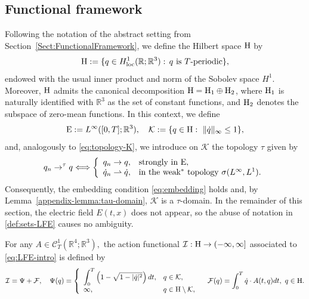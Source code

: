 \documentclass{article}
\newcommand{\boK}{\mathcal{K}}
\newcommand{\boI}{\mathcal{I}}
\newcommand{\R}{\mathbb{R}}
\newcommand{\boF}{\mathcal{F}}
\newcommand{\dq}{\dot{q}}
\newcommand{\Hilb}{{\textnormal H}}
\newcommand{\Ebanach}{{\textnormal E}}
\theoremstyle{definition}
\begin{document}
	\subsection{Functional framework}\label{Sect:LFE-Functional}
	Following the notation of the abstract setting from Section~\ref{Sect:FunctionalFramework}, we define the Hilbert space $\Hilb$ by
	\begin{equation}\label{Hilbert}
		\Hilb:=\{q\in H^1_{\text{loc}}(\R;\R^3):\,q\text{ is }T\text{-periodic}\},
	\end{equation}
	endowed with the usual inner product and norm of the Sobolev space $H^1$. Moreover, $\Hilb$ admits the canonical decomposition $\Hilb=\Hilb_1\oplus\Hilb_2$, where $\Hilb_1$ is naturally identified with $\R^3$ as the set of constant functions, and $\Hilb_2$ denotes the subspace of zero-mean functions. In this context, we define
	\begin{equation}\label{def:sets-LFE}
		\Ebanach:=L^\infty([0,T];\R^3),\quad \boK:=\{q\in\Hilb:\ \|\dq\|_\infty\leq1\},
	\end{equation}
	and, analogously to \eqref{eq:topology-K}, we introduce on $\boK$ the topology $\tau$ given by
	\begin{equation}\label{def:topology-LFE}
		q_n\to^\tau q\Longleftrightarrow\left\{\begin{array}{ll}
			q_n\to q,&\text{strongly in }\Ebanach,
			\\
			\dot{q}_n\rightharpoonup \dot{q},&\text{in the weak$^*$ topology }\sigma(L^\infty,L^1).
		\end{array}\right.
	\end{equation}
	Consequently, the embedding condition \eqref{eq:embedding} holds and, by Lemma~\ref{appendix-lemma:tau-domain}, $\boK$ is a $\tau$-domain.  In the remainder of this section, the electric field $E(t,x)$ does not appear, so the abuse of notation in \eqref{def:sets-LFE} causes no ambiguity.
	
	For any $A\in\mathcal{C}_T^1\left(\R^4;\R^3\right),$ the action functional  $\boI:\Hilb\to (-\infty,\infty]$ associated to \eqref{eq:LFE-intro} is defined by
	\begin{equation}\label{eq:functional}
		\boI=\Psi+\boF,\quad\Psi(q)=\left\{\begin{array}{ll}
			\displaystyle\int_0^T \left(1-\sqrt{1-|\dq|^2}\right)dt,& q\in\boK,\\
			\infty,&  q\in\Hilb\setminus\boK,
		\end{array}\right.\quad
		\boF(q)=\int_0^T \dq\cdot A(t,q)dt,\ q\in\Hilb.
	\end{equation}
	
\end{document}
